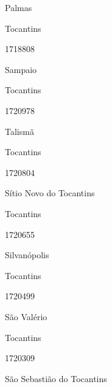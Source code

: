 \documentclass[
  letterpaper,
]{report}
\begin{document}
\n      

Palmas

\n    

\n    

\n      

Tocantins

\n      

1718808

\n      

Sampaio

\n    

\n    

\n      

Tocantins

\n      

1720978

\n      

Talismã

\n    

\n    

\n      

Tocantins

\n      

1720804

\n      

Sítio Novo do Tocantins

\n    

\n    

\n      

Tocantins

\n      

1720655

\n      

Silvanópolis

\n    

\n    

\n      

Tocantins

\n      

1720499

\n      

São Valério

\n    

\n    

\n      

Tocantins

\n      

1720309

\n      

São Sebastião do Tocantins

\n    

\n    
\end{document}
